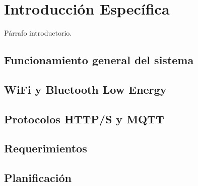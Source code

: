 \chapter{Introducción Específica}
\label{Chapter2}

Párrafo introductorio.

\section{Funcionamiento general del sistema}

\section{WiFi y Bluetooth Low Energy}

\section{Protocolos HTTP/S y MQTT}

\section{Requerimientos}

\section{Planificación}


